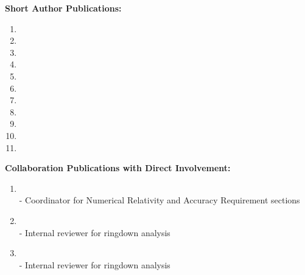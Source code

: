 \documentclass[11pt]{article}
\newcounter{papers}
\begin{document}
\begin{flushleft}
  \vspace{32px}

  \textbf{Short Author Publications:}
  \begin{enumerate}      
    \item {}
    \item {}
    \item {}
    \item {}
    \item {}
    \item {}
	\item {}
    \item {}
    \item {}
    \item {}
    \item {}
    \setcounter{papers}{\value{enumi}}
  \end{enumerate}
  
  \textbf{Collaboration Publications with Direct Involvement:}  
  \begin{enumerate}
  \setcounter{enumi}{\value{papers}}
  \item {}\\
  - Coordinator for Numerical Relativity and Accuracy Requirement sections
  \item {}\\
  - Internal reviewer for ringdown analysis
  \item {}\\
  - Internal reviewer for ringdown analysis
  \setcounter{papers}{\value{enumi}}
  \end{enumerate}
  

\end{flushleft}
\end{document}
